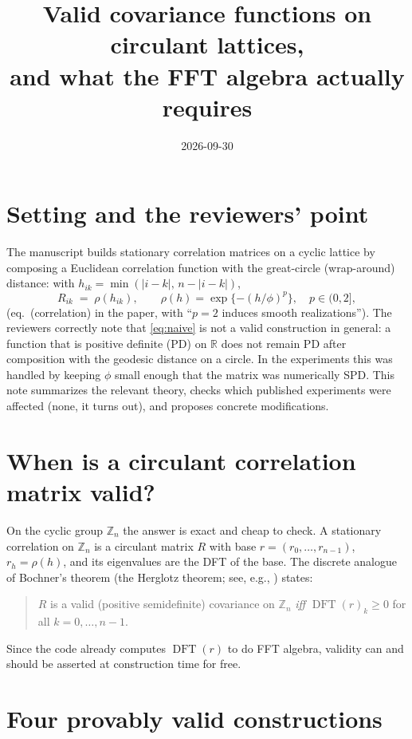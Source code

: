 \documentclass[11pt]{article}
\title{Valid covariance functions on circulant lattices,\\ and what the FFT
  algebra actually requires}
\author{}
\date{2026-09-30}
\newcommand{\Z}{\mathbb{Z}}
\newcommand{\R}{\mathbb{R}}
\newcommand{\dft}{\operatorname{DFT}}
\begin{document}
\maketitle

\section{Setting and the reviewers' point}

The manuscript builds stationary correlation matrices on a cyclic lattice by
composing a Euclidean correlation function with the great-circle (wrap-around)
distance: with $h_{ik} = \min(|i-k|,\, n-|i-k|)$,
\begin{equation} \label{eq:naive}
  R_{ik} \;=\; \rho(h_{ik}), \qquad
  \rho(h) = \exp\{-(h/\phi)^p\}, \quad p \in (0, 2],
\end{equation}
(eq.~(correlation) in the paper, with ``$p=2$ induces smooth realizations'').
The reviewers correctly note that \eqref{eq:naive} is not a valid construction
in general: a function that is positive definite (PD) on $\R$ does not remain
PD after composition with the geodesic distance on a circle. In the
experiments this was handled by keeping $\phi$ small enough that the matrix
was numerically SPD. This note summarizes the relevant theory, checks which
published experiments were affected (none, it turns out), and proposes
concrete modifications.

\section{When is a circulant correlation matrix valid?}

On the cyclic group $\Z_n$ the answer is exact and cheap to check. A
stationary correlation on $\Z_n$ is a circulant matrix $R$ with base
$r = (r_0, \dots, r_{n-1})$, $r_h = \rho(h)$, and its eigenvalues are the DFT
of the base. The discrete analogue of Bochner's theorem (the Herglotz
theorem; see, e.g., \citealp[Ch.~4]{BrockwellDavis1991}) states:
\begin{quote}
  $R$ is a valid (positive semidefinite) covariance on $\Z_n$ \emph{iff}
  $\dft(r)_k \ge 0$ for all $k = 0, \dots, n-1$.
\end{quote}
Since the code already computes $\dft(r)$ to do FFT algebra, validity can and
should be asserted at construction time for free.

\section{Four provably valid constructions}
\end{document}
